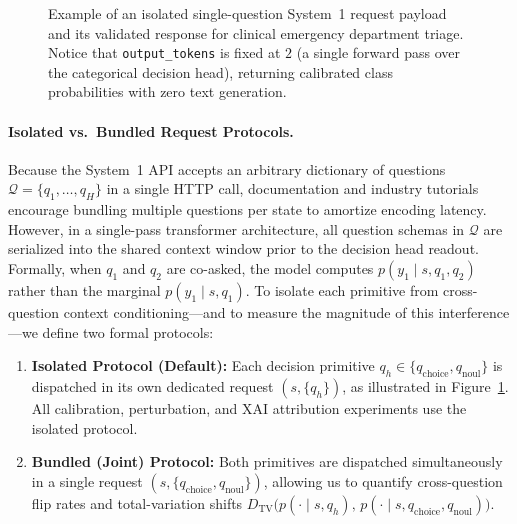 \documentclass[10pt]{article}
\begin{document}
\begin{figure}[t]
\caption{Example of an isolated single-question System~1 request payload and its validated response for clinical emergency department triage. Notice that \texttt{output\_tokens} is fixed at $2$ (a single forward pass over the categorical decision head), returning calibrated class probabilities with zero text generation.}
\label{fig:payload}
\end{figure}

\paragraph{Isolated vs.\ Bundled Request Protocols.}
Because the System~1 API accepts an arbitrary dictionary of questions $\mathcal{Q} = \{q_1, \dots, q_H\}$ in a single HTTP call, documentation and industry tutorials encourage bundling multiple questions per state to amortize encoding latency.
However, in a single-pass transformer architecture, all question schemas in $\mathcal{Q}$ are serialized into the shared context window prior to the decision head readout.
Formally, when $q_1$ and $q_2$ are co-asked, the model computes $p(y_1 \mid s, q_1, q_2)$ rather than the marginal $p(y_1 \mid s, q_1)$.
To isolate each primitive from cross-question context conditioning---and to measure the magnitude of this interference---we define two formal protocols:
\begin{enumerate}
\item \textbf{Isolated Protocol (Default):} Each decision primitive $q_h \in \{q_{\text{choice}}, q_{\text{noul}}\}$ is dispatched in its own dedicated request $(s, \{q_h\})$, as illustrated in Figure~\ref{fig:payload}. All calibration, perturbation, and XAI attribution experiments use the isolated protocol.
\item \textbf{Bundled (Joint) Protocol:} Both primitives are dispatched simultaneously in a single request $(s, \{q_{\text{choice}}, q_{\text{noul}}\})$, allowing us to quantify cross-question flip rates and total-variation shifts $D_{\text{TV}}\big(p(\cdot \mid s, q_h),\, p(\cdot \mid s, q_{\text{choice}}, q_{\text{noul}})\big)$.
\end{enumerate}
\end{document}
